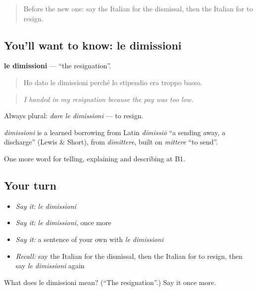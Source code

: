 \begin{quote}
Before the new one: say the Italian for the dismissal, then the Italian for to resign.
\end{quote}

\subsection*{You'll want to know: le dimissioni}
\textbf{le dimissioni} — \textquotedblleft{}the resignation\textquotedblright{}.

\begin{quote}
Ho dato le dimissioni perché lo stipendio era troppo basso.
\end{quote}

\begin{quote}
\emph{I handed in my resignation because the pay was too low.}
\end{quote}

Always plural: \emph{dare le dimissioni} — to resign.

\begin{cousinweb}
\emph{dimissioni} is a learned borrowing from Latin \emph{dīmissiō} \textquotedblleft{}a sending away, a discharge\textquotedblright{} (Lewis \& Short), from \emph{dīmittere}, built on \emph{mittere} \textquotedblleft{}to send\textquotedblright{}.
\end{cousinweb}

\begin{grammarlens}[title={What you've built}]
One more word for telling, explaining and describing at B1.
\end{grammarlens}

\subsection*{Your turn}
\begin{itemize}
\raggedright
  \item \emph{Say it:} \emph{le dimissioni}
  \item \emph{Say it:} \emph{le dimissioni}, once more
  \item \emph{Say it:} a sentence of your own with \emph{le dimissioni}
  \item \emph{Recall:} say the Italian for the dismissal, then the Italian for to resign, then say \emph{le dimissioni} again
\end{itemize}

\begin{tcolorbox}[breakable,colback=teal!4,colframe=teal!35!black,title={Before you move on}]
What does le dimissioni mean? (\textquotedblleft{}The resignation\textquotedblright{}.) Say it once more.
\end{tcolorbox}
